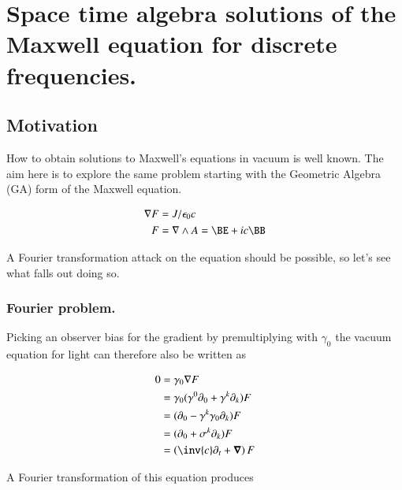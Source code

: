 

\chapter{Space time algebra solutions of the Maxwell equation for discrete frequencies.}
\label{chap:maxwellVacuum}
\date{July 2, 2009}

\beginArtWithToc

\section{Motivation}

How to obtain solutions to Maxwell's equations in vacuum is well known.  The aim here is to explore the same problem starting with the Geometric Algebra (GA) form of the Maxwell equation.  

\begin{align}\label{eqn:maxwell}
\grad F &= J/\epsilon_0 c \\
F &= \grad \wedge A = \BE + i c \BB
\end{align}

A Fourier transformation attack on the equation should be possible, so let's see what falls out doing so.

\subsection{Fourier problem.}

Picking an observer bias for the gradient by premultiplying with $\gamma_0$ the vacuum equation for light can therefore also be written as

\begin{align*}
0
&= \gamma_0 \grad F \\
&= \gamma_0 (\gamma^0 \partial_0 + \gamma^k \partial_k) F \\
&= (\partial_0 - \gamma^k \gamma_0 \partial_k) F \\
&= (\partial_0 + \sigma^k \partial_k) F \\
&= \left(\inv{c}\partial_t + \spacegrad \right) F \\
\end{align*}

A Fourier transformation of this equation produces

